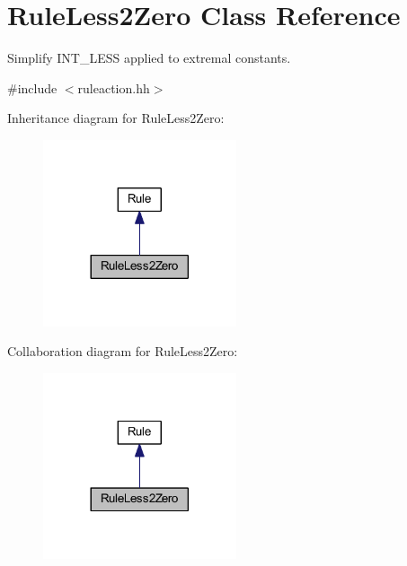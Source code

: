 \hypertarget{class_rule_less2_zero}{}\section{Rule\+Less2\+Zero Class Reference}
\label{class_rule_less2_zero}


Simplify I\+N\+T\+\_\+\+L\+E\+SS applied to extremal constants.  




{\ttfamily \#include $<$ruleaction.\+hh$>$}



Inheritance diagram for Rule\+Less2\+Zero\+:
\nopagebreak
\begin{figure}[H]
\begin{center}
\leavevmode
\includegraphics[width=161pt]{class_rule_less2_zero__inherit__graph}
\end{center}
\end{figure}


Collaboration diagram for Rule\+Less2\+Zero\+:
\nopagebreak
\begin{figure}[H]
\begin{center}
\leavevmode
\includegraphics[width=161pt]{class_rule_less2_zero__coll__graph}
\end{center}
\end{figure}
